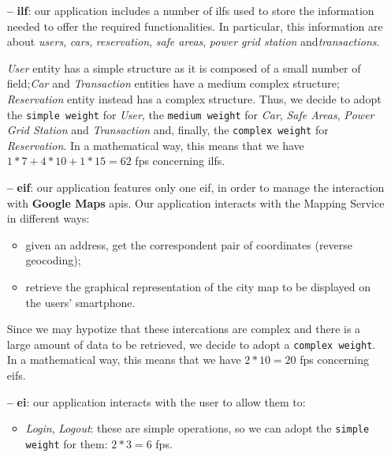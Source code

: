\begin{itemize}

\item[\textbf{--}] \textbf{\acl{ilf}}: our application includes a number of \acs{ilf}s used to store the information needed to offer the required functionalities. In particular, this information are about \textit{users}, \textit{cars}, \textit{reservation}, \textit{safe areas}, \textit{power grid station} and\textit{transactions}. 

\textit{User} entity has a simple structure as it is composed of a small number of field;\textit{Car} and \textit{Transaction} entities have a medium complex structure; \textit{Reservation} entity instead has a complex structure. Thus, we decide to adopt the \texttt{simple weight} for \textit{User}, the \texttt{medium weight} for \textit{Car}, \textit{Safe Areas}, \textit{Power Grid Station} and \textit{Transaction} and, finally, the \texttt{complex weight} for \textit{Reservation}.
In a mathematical way, this means that we have $1 * 7 + 4 * 10 + 1 * 15 = 62$ \acs{fp}s concerning \acs{ilf}s.

\item[\textbf{--}] \textbf{\acl{eif}}: our application features only one \acs{eif}, in order to manage the interaction with \textbf{Google Maps} \acs{api}s. 
Our application interacts with the Mapping Service in different ways:
	\begin{itemize}
	
	\item given an address, get the correspondent pair of coordinates (reverse geocoding);

	\item retrieve the graphical representation of the city map to be displayed on the users' smartphone.

    \end{itemize}

Since we may hypotize that these intercations are complex and there is a large amount of data to be retrieved, we decide to adopt a \texttt{complex weight}. 
In a mathematical way, this means that we have $2 * 10 = 20$ \acs{fp}s concerning \acs{eif}s.

\item[\textbf{--}] \textbf{\acl{ei}}: our application interacts with the user to allow them to:
	\begin{itemize}

	\item \textit{Login}, \textit{Logout}: these are simple operations, so we can adopt the \texttt{simple weight} for them: $2 * 3 = 6$ \acs{fp}s.
	

\end{itemize}
\end{itemize}
